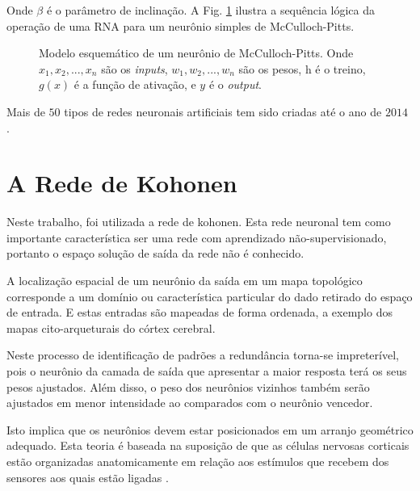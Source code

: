 Onde $\beta$ é o parâmetro de inclinação. A Fig. \ref{Esquematico de McCulloch} ilustra a sequência lógica da operação de uma RNA para um neurônio simples de McCulloch-Pitts. 
\\
\begin{figure}[H]
	\centering
	\setlength{\fboxsep}{8pt}
	\setlength{\fboxrule}{0.1pt}
	\caption{Modelo esquemático de um neurônio de McCulloch-Pitts. Onde $x_{1}, x_{2}, ..., x_{n}$ são os \textit{inputs}, $w_{1}, w_{2}, ..., w_{n}$ são os pesos, h é o treino, $g(x)$ é a função de ativação, e $y$ é o \textit{output}.}
	\label{Esquematico de McCulloch}
\end{figure}

Mais de $50$ tipos de redes neuronais artificiais tem sido criadas até o ano de $2014$ \citep{Saljooghi2014}.


\section{A Rede de Kohonen}

Neste trabalho, foi utilizada a rede de kohonen. Esta rede neuronal tem como importante característica ser uma rede com aprendizado não-supervisionado, portanto o espaço solução de saída da rede não é conhecido. 

A localização espacial de um neurônio da saída em um mapa topológico
corresponde a um domínio ou característica particular do dado retirado do espaço de entrada. E estas entradas são mapeadas de forma ordenada, a exemplo dos mapas cito-arqueturais do córtex cerebral.

Neste processo de identificação de padrões a redundância torna-se impreterível,
pois o neurônio da camada de saída que apresentar a maior resposta terá os seus
pesos ajustados. Além disso, o peso dos neurônios vizinhos também serão
ajustados em menor intensidade ao comparados com o neurônio vencedor.

Isto implica que os neurônios devem estar posicionados em um arranjo geométrico
adequado. Esta teoria é baseada na suposição de que as células nervosas
corticais estão organizadas anatomicamente em relação aos estímulos que recebem
dos sensores aos quais estão ligadas \citep{Artero2009}.

